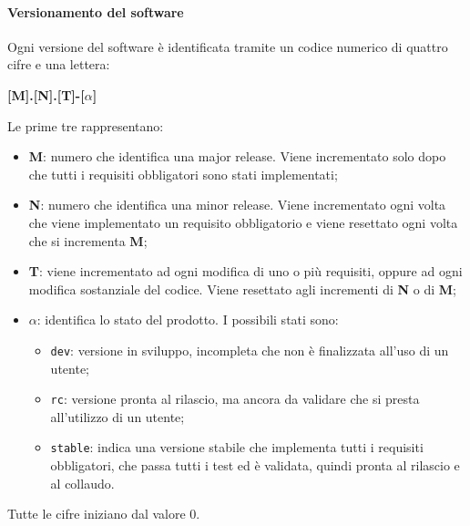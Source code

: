 \paragraph{Versionamento del software}
Ogni versione del software è identificata tramite un codice numerico di quattro cifre e una lettera:
\begin{center}
\textbf{[M].[N].[T]-[$\alpha$]} 
\end{center}
Le prime tre rappresentano:
\begin{itemize}
	\item \textbf{M}: numero che identifica una major release. Viene incrementato solo dopo che tutti i requisiti obbligatori sono stati implementati;
  	\item \textbf{N}: numero che identifica una minor release. Viene incrementato ogni volta che viene implementato un requisito obbligatorio e viene resettato ogni volta che si incrementa \textbf{M};
  	\item \textbf{T}: viene incrementato ad ogni modifica di uno o più requisiti, oppure ad ogni modifica sostanziale del codice. Viene resettato agli incrementi di \textbf{N} o di \textbf{M};
  	\item \textbf{$\alpha$}: identifica lo stato del prodotto. I possibili stati sono:
  	\begin{itemize}
  		\item \texttt{dev}: versione in sviluppo, incompleta che non è finalizzata all'uso di un utente;
  		\item \texttt{rc}: versione pronta al rilascio, ma ancora da validare che si presta all'utilizzo di un utente; 
  		\item \texttt{stable}: indica una versione stabile che implementa tutti i requisiti obbligatori, che passa tutti i test ed è validata, quindi pronta al rilascio e al collaudo.  
	\end{itemize} 
\end{itemize}

Tutte le cifre iniziano dal valore 0. \\ 

